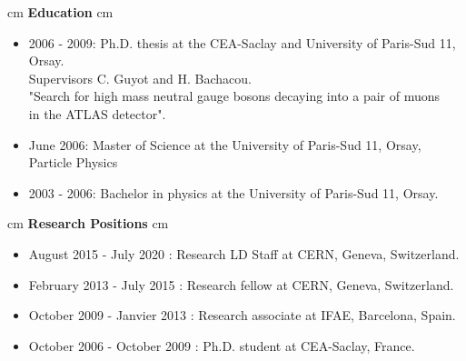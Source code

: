 \documentclass[12pt]{article}
\begin{document}
 cm
{\bf \large Education}
 cm
\TabPositions{2.5cm}
\begin{itemize}
\itemsep0em
\item[] 2006 - 2009: \tab  Ph.D. thesis at the CEA-Saclay and University of Paris-Sud 11, Orsay. \\
\tab \tab Supervisors C. Guyot and H. Bachacou. \\
\tab \tab "Search for high mass neutral gauge bosons decaying into a pair of muons\\
\tab \tab in the ATLAS detector".
\item[]June 2006: \tab  Master of Science at the University of Paris-Sud 11, Orsay, \\
\tab \tab Particle Physics
\item[] 2003 - 2006:  \tab  Bachelor in physics at the University of Paris-Sud 11, Orsay.
\end{itemize}






 cm
{\bf \large Research Positions}
 cm
\TabPositions{5.4cm}
\begin{itemize}
\itemsep0em
\item[] August 2015 - July 2020  \tab : Research LD Staff at CERN, Geneva, Switzerland.
\item[] February 2013 - July 2015  \tab : Research fellow at CERN, Geneva, Switzerland.
\item[] October 2009 - Janvier 2013 \tab : Research associate at IFAE, Barcelona, Spain.
\item[] October 2006 - October 2009 \tab : Ph.D. student at CEA-Saclay, France.
\end{itemize}
\end{document}
